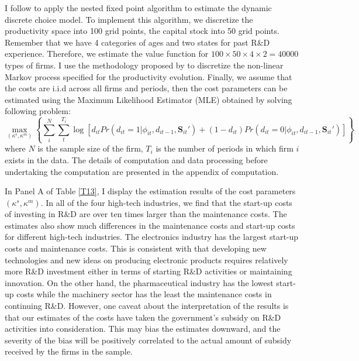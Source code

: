 \documentclass[English]{article}
\begin{document}
I follow \citet{Rust1987} to apply the nested fixed point algorithm to estimate the dynamic discrete choice model. To implement this algorithm, we discretize the productivity space into 100 grid points, the capital stock into 50 grid points. Remember that we have 4 categories of ages and two states for past R\&D experience. Therefore, we estimate the value function for $100\times 50 \times 4\times 2=40000$ types of firms. I use the methodology proposed by \citet{farmer2017} to discretize the non-linear Markov process specified for the productivity evolution. Finally, we assume that the costs are i.i.d across all firms and periods, then the cost parameters can be estimated using the Maximum Likelihood Estimator (MLE)  obtained by solving following problem:
\begin{equation}
\max_{(\kappa^{s},\kappa^{m})}\left\{\sum_{i}^{N}\sum_{t}^{T_i} \log \left[ d_{it}Pr(d_{it}=1|\phi_{it},d_{it-1},\mathbf{S}_{it}')+(1-d_{it})Pr(d_{it}=0|\phi_{it},d_{it-1},\mathbf{S}_{it}')\right] \right\}
\end{equation}
where $N$ is the sample size of the firm, $T_i$ is the number of periods in which firm $i$ exists in the data. The details of computation and data processing before undertaking the computation are presented in the appendix of computation.

In Panel A of Table \ref{T13}, I display the estimation results of the cost parameters $(\kappa ^s,\kappa ^m)$. In all of the four high-tech industries, we find that the start-up costs of investing in R\&D are over ten times larger than the maintenance costs. The estimates also show much differences in the maintenance costs and start-up costs for different high-tech industries. The electronics industry has the largest start-up costs and maintenance costs. This is consistent with that developing new technologies and new ideas on producing electronic products requires relatively more R\&D investment either in terms of starting R\&D activities or maintaining innovation. On the other hand, the pharmaceutical industry has the lowest start-up costs while the machinery sector has the least the maintenance costs in continuing R\&D. However, one caveat about the interpretation of the results is that our estimates of the costs have taken the government's subsidy on R\&D activities into consideration. This may bias the estimates downward, and the severity of the bias will be positively correlated to the actual amount of subsidy received by the firms in the sample.
\end{document}
